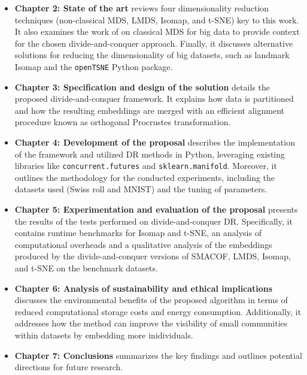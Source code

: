 \begin{itemize}
    \item \textbf{Chapter 2: State of the art} reviews four dimensionality reduction techniques (non-classical MDS, LMDS, Isomap, and t-SNE) key to this work. It also examines the work of \citet{Delicado2024} on classical MDS for big data to provide context for the chosen divide-and-conquer approach. Finally, it discusses alternative solutions for reducing the dimensionality of big datasets, such as landmark Isomap and the \verb|openTSNE| Python package.
    \item \textbf{Chapter 3: Specification and design of the solution} details the proposed divide-and-conquer framework. It explains how data is partitioned and how the resulting embeddings are merged with an efficient alignment procedure known as orthogonal Procrustes transformation.
    \item \textbf{Chapter 4: Development of the proposal} describes the implementation of the framework and utilized DR methods in Python, leveraging existing libraries like \verb|concurrent.futures| and \verb|sklearn.manifold|. Moreover, it outlines the methodology for the conducted experiments, including the datasets used (Swiss roll and MNIST) and the tuning of parameters.
    \item \textbf{Chapter 5: Experimentation and evaluation of the proposal} presents the results of the tests performed on divide-and-conquer DR. Specifically, it contains runtime benchmarks for Isomap and t-SNE, an analysis of computational overheads and a qualitative analysis of the embeddings produced by the divide-and-conquer versions of SMACOF, LMDS, Isomap, and t-SNE on the benchmark datasets.
    \item \textbf{Chapter 6: Analysis of sustainability and ethical implications} discusses the environmental benefits of the proposed algorithm in terms of reduced computational storage costs and energy consumption. Additionally, it addresses how the method can improve the visibility of small communities within datasets by embedding more inidividuals.
    \item \textbf{Chapter 7: Conclusions} summarizes the key findings and outlines potential directions for future research. 
\end{itemize}